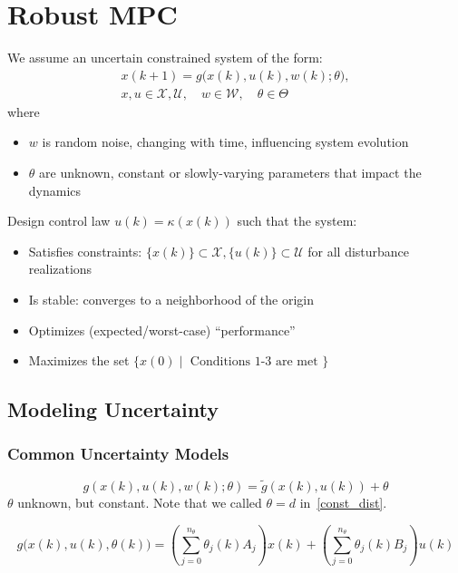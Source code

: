 \section{Robust MPC}
We assume an uncertain constrained system of the form:
\begin{gather*}
    x(k + 1) = g\bigl(x(k), u(k), w(k); \theta\bigr),\\
    x, u \in \mathcal{X}, \mathcal{U}, \quad w \in \mathcal{W}, \quad \theta \in \Theta
\end{gather*}
where
\begin{itemize}
    \item $w$ is random noise, changing with time, influencing system evolution
    \item $\theta$ are unknown, constant or slowly-varying parameters that impact the dynamics
\end{itemize}
\newpar{}

Design control law $u(k) = \kappa(x(k))$ such that the system:
\begin{itemize}
    \item Satisfies constraints: $\{x(k)\} \subset \mathcal{X}, \{u(k)\} \subset \mathcal{U}$ for all disturbance realizations
    \item Is stable: converges to a neighborhood of the origin
    \item Optimizes (expected/worst-case) ``performance''
    \item Maximizes the set $\{x(0) \mid \text{ Conditions 1-3 are met }\}$
\end{itemize}

\subsection{Modeling Uncertainty}
\subsubsection{Common Uncertainty Models}

\begin{equation*}
    g(x(k), u(k), w(k); \theta) = \tilde{g}(x(k), u(k)) + \theta
\end{equation*}
$\theta$ unknown, but constant. Note that we called $\theta = d$ in~\ref{const_dist}.

\newpar{}

{\small
    \begin{equation*}
        g\bigl(x(k), u(k), \theta(k)\bigr) =
        \left( \sum_{j=0}^{n_\theta} \theta_j(k) A_j \right)x(k) +
        \left( \sum_{j=0}^{n_\theta} \theta_j(k) B_j \right)u(k)
    \end{equation*}
}


